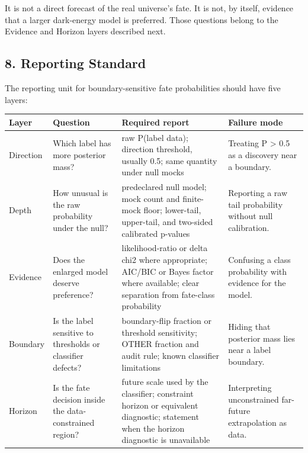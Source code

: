 \documentclass[
]{article}
\newcounter{none} %
\begin{document}
It is not a direct forecast of the real universe's fate. It is not, by
itself, evidence that a larger dark-energy model is preferred. Those
questions belong to the Evidence and Horizon layers described next.

\subsection{8. Reporting Standard}\label{reporting-standard}

The reporting unit for boundary-sensitive fate probabilities should have
five layers:

{\def\LTcaptype{none} %
\begin{longtable}[]{@{}
  >{\raggedright\arraybackslash}p{}
  >{\raggedright\arraybackslash}p{}
  >{\raggedright\arraybackslash}p{}
  >{\raggedright\arraybackslash}p{}@{}}
\toprule\noalign{}
\begin{minipage}[b]{\linewidth}\raggedright
Layer
\end{minipage} & \begin{minipage}[b]{\linewidth}\raggedright
Question
\end{minipage} & \begin{minipage}[b]{\linewidth}\raggedright
Required report
\end{minipage} & \begin{minipage}[b]{\linewidth}\raggedright
Failure mode
\end{minipage} \\
\midrule\noalign{}
\endhead
\bottomrule\noalign{}
\endlastfoot
Direction & Which label has more posterior mass? & raw P(label
\textbar{} data); direction threshold, usually 0.5; same quantity under
null mocks & Treating P \textgreater{} 0.5 as a discovery near a
boundary. \\
Depth & How unusual is the raw probability under the null? & predeclared
null model; mock count and finite-mock floor; lower-tail, upper-tail,
and two-sided calibrated p-values & Reporting a raw tail probability
without null calibration. \\
Evidence & Does the enlarged model deserve preference? &
likelihood-ratio or delta chi2 where appropriate; AIC/BIC or Bayes
factor where available; clear separation from fate-class probability &
Confusing a class probability with evidence for the model. \\
Boundary & Is the label sensitive to thresholds or classifier defects? &
boundary-flip fraction or threshold sensitivity; OTHER fraction and
audit rule; known classifier limitations & Hiding that posterior mass
lies near a label boundary. \\
Horizon & Is the fate decision inside the data-constrained region? &
future scale used by the classifier; constraint horizon or equivalent
diagnostic; statement when the horizon diagnostic is unavailable &
Interpreting unconstrained far-future extrapolation as data. \\
\end{longtable}
}
\end{document}
